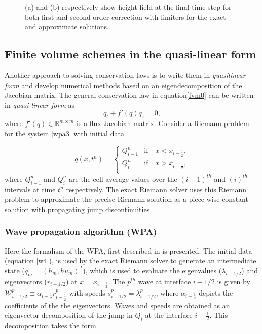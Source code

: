 \documentclass[9pt,a4paper]{article}
\begin{document}
\begin{figure}[H]
\begin{subfigure}[b]{0.5\textwidth}
			\caption{}
			\label{fig:exapp}
		\end{subfigure}
		\caption{(a) and (b) respectively show height field at the final time step for both first and second-order correction with limiters for the exact and approximate solutions.}
	\end{figure}
	
	
	\subsection{Finite volume schemes in the quasi-linear form}
	Another approach to solving conservation laws is to write  them in  {\em quasilinear form} and develop numerical methods based on an eigendecomposition of the Jacobian matrix. The general conservation law in equation\eqref{fvm0} can be written in {\em quasi-linear form}
	as
	\begin{equation}
		q_{t} + f'(q)q_{x} = 0,
		\label{wpa3}
	\end{equation}
	where  $f'(q) \in \mathbb{R}^{m\times m}$  is a flux Jacobian matrix.  Consider a Riemann problem for the system  \eqref{wpa3} with initial data 
	
	\begin{equation}
		q(x,t^n)  = \begin{cases}
			Q_{i-1}^{n}  & \text{if} \quad  x < x_{i-\frac{1}{2}},\\
			Q_{i}^{n} & \text{if} \quad x > x_{i-\frac{1}{2}},\\
		\end{cases}    
		\label{w4}   
	\end{equation}
	where $Q_{i-1}^{n}$ and $Q_{i}^{n}$ are the cell average values over the $(i-1)^{th}$ and $(i)^{th}$ intervals at time $t^{n}$ respectively.  The exact Riemann solver uses this Riemann problem to approximate the precise Riemann solution as a piece-wise constant solution with propagating jump discontinuities. 
	
	\subsubsection{Wave propagation algorithm (WPA)}
	Here the formalism of the WPA, first described in  \citet{le:1997} is presented.   The initial data (equation \eqref{w4}), is used by the exact Riemann solver to generate an intermediate state ($q_m = (h_m, hu_m)^T$), which is used to evaluate the eigenvalues ($\lambda_{i-1/2}$) and eigenvectors ($r_{i-1/2}$) at $x = x_{i-\frac{1}{2}}$. The $p^{th}$ wave at interface $i-1/2$ is given by $\mathcal W^p_{i-1/2} \equiv \alpha_{i-\frac{1}{2}} r^p_{i-\frac{1}{2}}$ with speeds $s^p_{i-1/2} = \lambda^p_{i-1/2}$, where $ \alpha_{i-\frac{1}{2}}$ depicts the coefficients of the the eigenvectors.  Waves and speeds are obtained as an eigenvector decomposition of the jump in $Q_i$ at the interface $i-\frac{1}{2}$.  This decomposition takes the form
	
\end{document}
